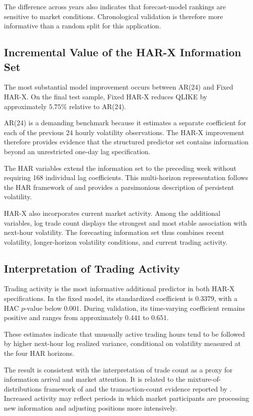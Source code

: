 The difference across years also indicates that forecast-model
rankings are sensitive to market conditions. Chronological
validation is therefore more informative than a random split
for this application.

\subsection{Incremental Value of the HAR-X Information Set}

The most substantial model improvement occurs between AR(24)
and Fixed HAR-X. On the final test sample, Fixed HAR-X reduces
QLIKE by approximately \(5.75\%\) relative to AR(24).

AR(24) is a demanding benchmark because it estimates a
separate coefficient for each of the previous 24 hourly
volatility observations. The HAR-X improvement therefore
provides evidence that the structured predictor set contains
information beyond an unrestricted one-day lag specification.

The HAR variables extend the information set to the preceding
week without requiring 168 individual lag coefficients. This
multi-horizon representation follows the HAR framework of
\citet{corsi2009} and provides a parsimonious description of
persistent volatility.

HAR-X also incorporates current market activity. Among the
additional variables, log trade count displays the strongest
and most stable association with next-hour volatility. The
forecasting information set thus combines recent volatility,
longer-horizon volatility conditions, and current trading
activity.

\subsection{Interpretation of Trading Activity}

Trading activity is the most informative additional predictor
in both HAR-X specifications. In the fixed model, its
standardized coefficient is \(0.3379\), with a HAC
\(p\)-value below \(0.001\). During validation, its
time-varying coefficient remains positive and ranges from
approximately \(0.441\) to \(0.651\).

These estimates indicate that unusually active trading hours
tend to be followed by higher next-hour log realized variance,
conditional on volatility measured at the four HAR horizons.

The result is consistent with the interpretation of trade
count as a proxy for information arrival and market attention.
It is related to the mixture-of-distributions framework of
\citet{clark1973} and the transaction-count evidence reported
by \citet{jones1994}. Increased activity may reflect periods
in which market participants are processing new information
and adjusting positions more intensively.

